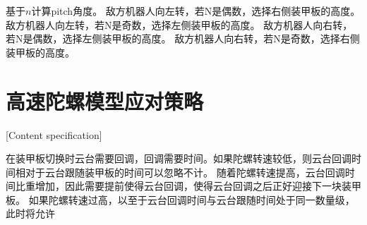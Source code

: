 基于$n$计算pitch角度。
敌方机器人向左转，若N是偶数，选择右侧装甲板的高度。
敌方机器人向左转，若N是奇数，选择左侧装甲板的高度。
敌方机器人向右转，若N是偶数，选择左侧装甲板的高度。
敌方机器人向右转，若N是奇数，选择右侧装甲板的高度。


\section{高速陀螺模型应对策略}[Content specification]


在装甲板切换时云台需要回调，回调需要时间。如果陀螺转速较低，则云台回调时间相对于云台跟随装甲板的时间可以忽略不计。
随着陀螺转速提高，云台回调时间比重增加，因此需要提前使得云台回调，使得云台回调之后正好迎接下一块装甲板。
如果陀螺转速过高，以至于云台回调时间与云台跟随时间处于同一数量级，此时将允许
